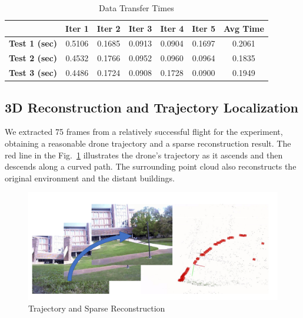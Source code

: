 \documentclass[conference]{IEEEtran}
\begin{document}
\begin{table}[h]
\centering
\caption{Data Transfer Times}
\label{tab:data times}
\begin{tabular}{lcccccc}
\toprule
 & \textbf{Iter 1} & \textbf{Iter 2} & \textbf{Iter 3} & \textbf{Iter 4} & \textbf{Iter 5} & \textbf{Avg Time} \\ \midrule
\textbf{Test 1 (sec)} & 0.5106 & 0.1685 & 0.0913 & 0.0904 & 0.1697 & 0.2061 \\
\textbf{Test 2 (sec)} & 0.4532 & 0.1766 & 0.0952 & 0.0960 & 0.0964 & 0.1835 \\
\textbf{Test 3 (sec)} & 0.4486 & 0.1724 & 0.0908 & 0.1728 & 0.0900 & 0.1949 \\ 
\bottomrule
\end{tabular}
\end{table}




\subsection{3D Reconstruction and Trajectory Localization}
We extracted 75 frames from a relatively successful flight for the experiment, obtaining a reasonable drone trajectory and a sparse reconstruction result. The red line in the Fig.~\ref{fig:reconstruction} illustrates the drone's trajectory as it ascends and then descends along a curved path. The surrounding point cloud also reconstructs the original environment and the distant buildings.
\begin{figure}[h]
    \centering
    \includegraphics[width=\columnwidth]{figures/reconstruction.pdf}
    \caption{Trajectory and Sparse Reconstruction}
    \label{fig:reconstruction}
\end{figure}
\end{document}
